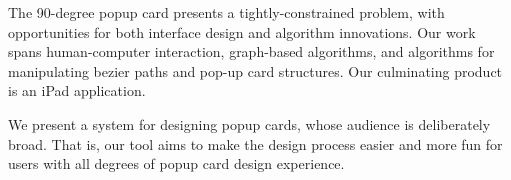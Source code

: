 The 90-degree popup card presents a tightly-constrained problem, with
opportunities for both interface design and algorithm innovations. Our
work spans human-computer interaction, graph-based algorithms, and
algorithms for manipulating bezier paths and pop-up card structures. Our
culminating product is an iPad application.

We present a system for designing popup cards, whose audience is
deliberately broad. That is, our tool aims to make the design process
easier and more fun for users with all degrees of popup card design
experience.
